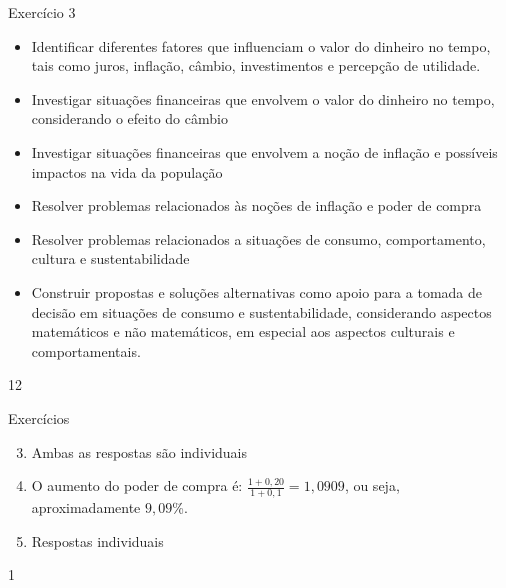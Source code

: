 \begin{objectives}{Exercício 3}
{\begin{itemize}
\item Identificar diferentes fatores que influenciam o valor do dinheiro no tempo, tais como juros, inflação, câmbio, investimentos e percepção de utilidade.
\item Investigar situações financeiras que envolvem o valor do dinheiro no tempo, considerando o efeito do câmbio
\end{itemize}

\begin{itemize}
\item Investigar situações financeiras que envolvem a noção de inflação e possíveis impactos na vida da população
\item Resolver problemas relacionados às noções de inflação e poder de compra
\end{itemize}

\begin{itemize}
\item Resolver problemas relacionados a situações de consumo, comportamento, cultura e sustentabilidade
\item Construir propostas e soluções alternativas como apoio para a tomada de decisão em situações de consumo e sustentabilidade, considerando aspectos matemáticos e não matemáticos, em especial aos aspectos culturais e comportamentais.
\end{itemize}}{1}{2}
\end{objectives}
\begin{answer}{Exercícios}
{\exerciselist
\begin{enumerate}
\setcounter{enumi}{2}
    \item Ambas as respostas são individuais

    \item O aumento do poder de compra é: $\displaystyle \frac{1+0{,}20}{1+0{,}1}=1{,}0909$, ou seja, aproximadamente $9{,}09$\%.
    \item Respostas individuais
  \end{enumerate}
}{1}
\end{answer}
\clearmargin

